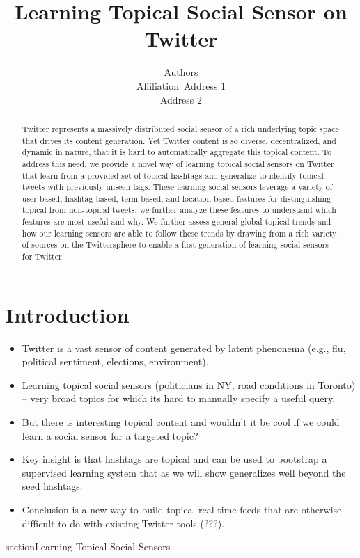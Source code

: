 \documentclass[letterpaper]{article}
\begin{document}
%
\title{Learning Topical Social Sensor on Twitter}
\author{Authors\\
Affiliation\
Address 1\\
Address 2\\
}
\maketitle
\begin{abstract}
Twitter represents a massively distributed social sensor of a rich underlying topic space that drives its content generation.  Yet Twitter content is so diverse, decentralized, and dynamic in nature, that it is hard to automatically aggregate this topical content.  To address this need, we provide a novel way of learning topical social sensors on Twitter that learn from a provided set of topical hashtags and generalize to identify topical tweets with previously unseen tags.  These learning social sensors leverage a variety of user-based, hashtag-based, term-based, and location-based features for distinguishing topical from non-topical tweets; we further analyze these features to understand which features are most useful and why.  We further assess general global topical trends and how our learning sensors are able to follow these trends by drawing from a rich variety of sources on the Twittersphere to enable a first generation of learning social sensors for Twitter. 
\end{abstract}

\section{Introduction}
\begin{itemize}
\item Twitter is a vast sensor of content generated by latent phenonema (e.g., flu, political sentiment, elections, environment).
\item Learning topical social sensors (politicians in NY, road conditions in Toronto) -- very broad topics for which its hard to manually specify a useful query.
\item But there is interesting topical content and wouldn't it be cool if we could learn a social sensor for a targeted topic?
\item Key insight is that hashtags are topical and can be used to bootstrap a supervised learning system that as we will show generalizes well beyond the seed hashtags.
\item Conclusion is a new way to build topical real-time feeds that are otherwise difficult to do with existing Twitter tools (???).
\end{itemize}
section{Learning Topical Social Sensors}
\end{document}
